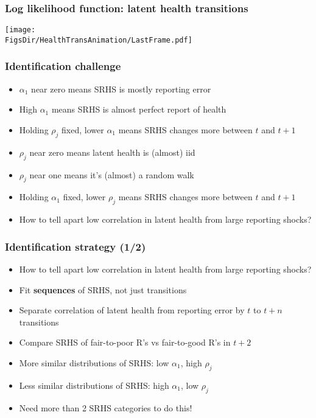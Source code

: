 \documentclass[aspectratio=169]{beamer}
\newcommand{\FigsDir}{../Figures}
\begin{document}
\begin{frame}\frametitle{Log likelihood function: latent health transitions}
\begin{center}
	\texttt{[image: \\FigsDir/HealthTransAnimation/LastFrame.pdf]}
\end{center}
\end{frame}


\begin{frame}\frametitle{Identification challenge}
\begin{itemize}
	\item <1->$\alpha_1$ near zero means SRHS is mostly reporting error
	
	\item <1->High $\alpha_1$ means SRHS is almost perfect report of health
	
	\item <2->Holding $\rho_{j}$ fixed, lower $\alpha_1$ means SRHS changes more between $t$ and $t+1$
	
	\item <3->$\rho_{j}$ near zero means latent health is (almost) iid
	
	\item <3->$\rho_{j}$ near one means it's (almost) a random walk
	
	\item <4->Holding $\alpha_1$ fixed, lower $\rho_j$ means SRHS changes more between $t$ and $t+1$
	
	\item <5->How to tell apart low correlation in latent health from large reporting shocks?
\end{itemize}
\end{frame}


\begin{frame}\frametitle{Identification strategy (1/2)}
\begin{itemize}
	\item <1->How to tell apart low correlation in latent health from large reporting shocks?
	
	\item <2->Fit \textbf{sequences} of SRHS, not just transitions
	
	\item <2->Separate correlation of latent health from reporting error by $t$ to $t+n$ transitions
	
	\item <3->Compare SRHS of fair-to-poor R's vs fair-to-good R's in $t+2$
	
	\item <4->More similar distributions of SRHS: low $\alpha_1$, high $\rho_j$
	
	\item <4->Less similar distributions of SRHS: high $\alpha_1$, low $\rho_j$
	
	\item <5->Need more than 2 SRHS categories to do this!
\end{itemize}
\end{frame}
\end{document}
